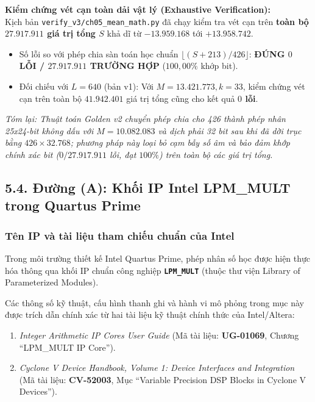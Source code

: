 \begin{verifygate}
\textbf{Kiểm chứng vét cạn toàn dải vật lý (Exhaustive Verification):}\\
Kịch bản \texttt{verify\_v3/ch05\_mean\_math.py} đã chạy kiểm tra vét cạn trên \textbf{toàn bộ $27.917.911$ giá trị tổng $S$} khả dĩ từ $-13.959.168$ tới $+13.958.742$. 
\begin{itemize}[leftmargin=1.5em, itemsep=2pt]
    \item Số lỗi so với phép chia sàn toán học chuẩn $\lfloor (S + 213)/426 \rfloor$: \textbf{ĐÚNG $0$ LỖI / $27.917.911$ TRƯỜNG HỢP} ($100{,}00\%$ khớp bit).
    \item Đối chiếu với $L = 640$ (bản v1): Với $M = 13.421.773, k = 33$, kiểm chứng vét cạn trên toàn bộ $41.942.401$ giá trị tổng cũng cho kết quả \textbf{$0$ lỗi}.
\end{itemize}
\end{verifygate}

\textit{Tóm lại: Thuật toán Golden v2 chuyển phép chia cho 426 thành phép nhân 25x24-bit không dấu với $M = 10.082.083$ và dịch phải 32 bit sau khi đã dời trục bằng $426 \times 32.768$; phương pháp này loại bỏ cạm bẫy số âm và bảo đảm khớp chính xác bit ($0 / 27.917.911$ lỗi, đạt $100\%$) trên toàn bộ các giá trị tổng.}

\subsection*{5.4. Đường (A): Khối IP Intel LPM\_MULT trong Quartus Prime}

\subsubsection*{Tên IP và tài liệu tham chiếu chuẩn của Intel}
Trong môi trường thiết kế Intel Quartus Prime, phép nhân số học được hiện thực hóa thông qua khối IP chuẩn công nghiệp \textbf{\texttt{LPM\_MULT}} (thuộc thư viện Library of Parameterized Modules).

Các thông số kỹ thuật, cấu hình thanh ghi và hành vi mô phỏng trong mục này được trích dẫn chính xác từ hai tài liệu kỹ thuật chính thức của Intel/Altera:
\begin{enumerate}[leftmargin=1.5em, itemsep=2pt]
    \item \emph{Integer Arithmetic IP Cores User Guide} (Mã tài liệu: \textbf{UG-01069}, Chương ``LPM\_MULT IP Core'').
    \item \emph{Cyclone V Device Handbook, Volume 1: Device Interfaces and Integration} (Mã tài liệu: \textbf{CV-52003}, Mục ``Variable Precision DSP Blocks in Cyclone V Devices'').
\end{enumerate}


